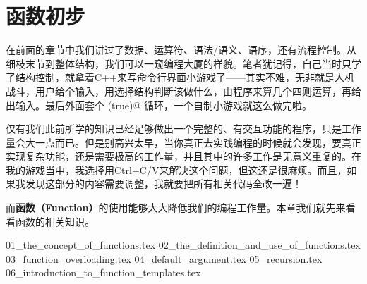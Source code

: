 \chapter{函数初步}
在前面的章节中我们讲过了数据、运算符、语法/语义、语序，还有流程控制。从细枝末节到整体结构，我们可以一窥编程大厦的样貌。笔者犹记得，自己当时只学了结构控制，就拿着C++来写命令行界面小游戏了——其实不难，无非就是人机战斗，用户给个输入，用选择结构判断该做什么，由程序来算几个四则运算，再给出输入。最后外面套个 \lstinline@while(true)@ 循环，一个自制小游戏就这么做完啦。\par
仅有我们此前所学的知识已经足够做出一个完整的、有交互功能的程序，只是工作量会大一点而已。但是别高兴太早，当你真正去实践编程的时候就会发现，要真正实现复杂功能，还是需要极高的工作量，并且其中的许多工作是无意义重复的。在我的游戏当中，我选择用Ctrl+C/V来解决这个问题，但这还是很麻烦。而且，如果我发现这部分的内容需要调整，我就要把所有相关代码全改一遍！\par
而\textbf{函数（Function）}的使用能够大大降低我们的编程工作量。本章我们就先来看看函数的相关知识。\par
{01_the_concept_of_functions.tex}
{02_the_definition_and_use_of_functions.tex}
{03_function_overloading.tex}
{04_default_argument.tex}
{05_recursion.tex}
{06_introduction_to_function_templates.tex}
